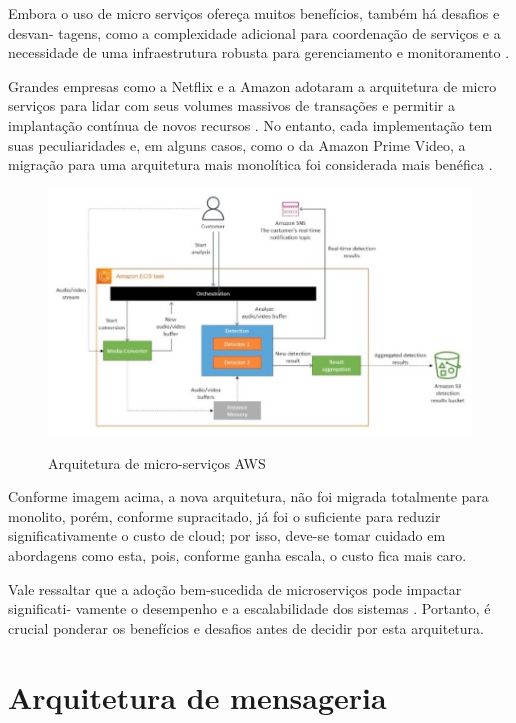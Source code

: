 Embora o uso de micro serviços ofereça muitos benefícios, também há desafios e desvan-
tagens, como a complexidade adicional para coordenação de serviços e a necessidade de uma
infraestrutura robusta para gerenciamento e monitoramento \cite{OReilly2018}.

Grandes empresas como a Netflix e a Amazon adotaram a arquitetura de micro serviços
para lidar com seus volumes massivos de transações e permitir a implantação contínua de
novos recursos \cite{BLOG2015}. No entanto, cada implementação tem suas
peculiaridades e, em alguns casos, como o da Amazon Prime Video, a migração para uma
arquitetura mais monolítica foi considerada mais benéfica \cite{Targett2023}.

\begin{figure}[!ht]
    \centering
    \caption{Arquitetura de micro-serviços AWS}
    \includegraphics[scale=0.44]{assets/aws-ms}
    \label{fig:aws-ms}
    \tiny
    \sourcemedaddy
\end{figure}

Conforme imagem acima, a nova arquitetura, não foi migrada totalmente para monolito,
porém, conforme supracitado, já foi o suficiente para reduzir significativamente o custo de cloud;
por isso, deve-se tomar cuidado em abordagens como esta, pois, conforme ganha escala, o custo
fica mais caro.

Vale ressaltar que a adoção bem-sucedida de microserviços pode impactar significati-
vamente o desempenho e a escalabilidade dos sistemas \cite{Dragoni2017}. Portanto, é
crucial ponderar os benefícios e desafios antes de decidir por esta arquitetura.


\section{Arquitetura de mensageria}

